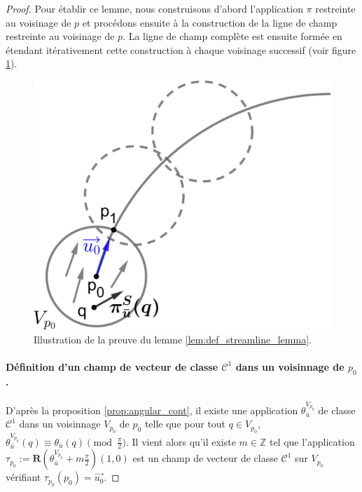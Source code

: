 \begin{proof}
Pour établir ce lemme, nous construisons d'abord l'application $\pi$ restreinte au voisinage de $p$ et procédons ensuite à la construction de la ligne de champ restreinte au voisinage de $p$. La ligne de champ complète est ensuite formée en étendant itérativement cette construction à chaque voisinage successif (voir figure \ref{fig:streamline_construction}).\
\begin{figure}[!h]
\centering
\includegraphics[scale=0.45]{images/streamline_construction.pdf}
\caption{Illustration de la preuve du lemme \ref{lem:def_streamline_lemma}.}
\label{fig:streamline_construction}
\end{figure}

\paragraph{Définition d'un champ de vecteur de classe $\mathcal{C}^1$ dans un voisinnage de $p_0$.} D'après la proposition \ref{prop:angular_cont}, il existe une application $\theta_{\bar{u}}^{V_{p_0}}$ de classe $\mathcal{C}^1$ dans un voisinnage $V_{p_0}$ de $p_0$ telle que pour tout $q\in V_{p_0}$, $\theta_{\bar{u}}^{V_{p_0}}(q)\equiv\theta_{\bar{u}}(q)\pmod{\frac{\pi}{2}}$. Il vient alors qu'il existe $m\in\mathbb{Z}$ tel que l'application $\tau_{p_0}:=\mathbf{R}(\theta_{\bar{u}}^{V_{p_0}}+m\frac{\pi}{2})(1, 0)$ est un champ de vecteur de classe $\mathcal{C}^1$ sur $V_{p_0}$ vérifiant $\tau_{p_0}(p_0)=\overrightarrow{u_0}$.


\end{proof}

